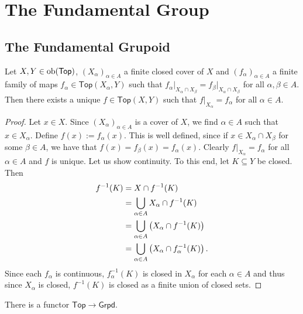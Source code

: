 \chapter{The Fundamental Group}
\section{The Fundamental Grupoid}

\begin{lemma}
	Let $X,Y \in \operatorname{ob}(\mathsf{Top})$, $(X_\alpha)_{\alpha \in A}$ a finite closed cover of $X$ and $(f_\alpha)_{\alpha \in A}$ a finite family of maps $f_\alpha \in \mathsf{Top}(X_\alpha,Y)$ such that $f_\alpha\vert_{X_\alpha \cap X_\beta} = f_\beta\vert_{X_\alpha \cap X_\beta}$ for all $\alpha,\beta \in A$. Then there exists a unique $f \in \mathsf{Top}(X,Y)$ such that $f\vert_{X_\alpha} = f_\alpha$ for all $\alpha \in A$.
	\label{lem:gluing_lemma}
\end{lemma}

\begin{proof}
	Let $x \in X$. Since $(X_\alpha)_{\alpha \in A}$ is a cover of $X$, we find $\alpha \in A$ such that $x \in X_\alpha$. Define $f(x) := f_\alpha(x)$. This is well defined, since if $x \in X_\alpha \cap X_\beta$ for some $\beta \in A$, we have that $f(x) = f_\beta(x) = f_\alpha(x)$. Clearly $f\vert_{X_\alpha} = f_\alpha$ for all $\alpha \in A$ and $f$ is unique. Let us show continuity. To this end, let $K \subseteq Y$ be closed. Then 
	\begin{align*}
		f^{-1}(K) &= X \cap f^{-1}(K)\\
		&= \bigcup_{\alpha \in A} X_\alpha \cap f^{-1}(K)\\
		&= \bigcup_{\alpha \in A} \del[1]{X_\alpha \cap f^{-1}(K)}\\
		&= \bigcup_{\alpha \in A} \del[1]{X_\alpha \cap f_\alpha^{-1}(K)}. 
	\end{align*}
	Since each $f_\alpha$ is continuous, $f_\alpha^{-1}(K)$ is closed in $X_\alpha$ for each $\alpha \in A$ and thus since $X_\alpha$ is closed, $f^{-1}(K)$ is closed as a finite union of closed sets.
\end{proof}

\begin{theorem}
	There is a functor $\mathsf{Top} \to \mathsf{Grpd}$. 
\end{theorem}

